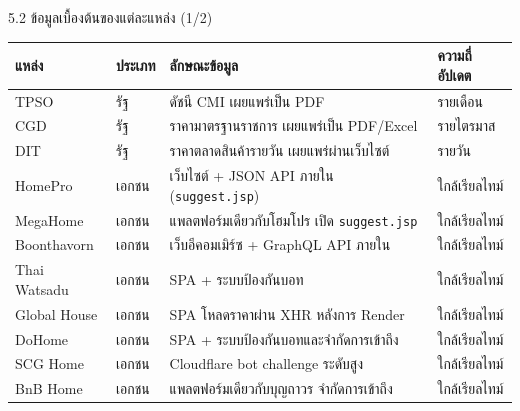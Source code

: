 \documentclass[aspectratio=169,11pt]{beamer}
\begin{document}
\begin{frame}{5.2 ข้อมูลเบื้องต้นของแต่ละแหล่ง (1/2)}
  \scriptsize
  \begin{table}
    \centering
    \begin{tabularx}{\textwidth}{l l X l}
      \toprule
      \textbf{แหล่ง} & \textbf{ประเภท} & \textbf{ลักษณะข้อมูล} & \textbf{ความถี่อัปเดต} \\
      \midrule
      TPSO         & รัฐ          & ดัชนี CMI เผยแพร่เป็น PDF                          & รายเดือน \\
      CGD          & รัฐ          & ราคามาตรฐานราชการ เผยแพร่เป็น PDF/Excel              & รายไตรมาส \\
      DIT          & รัฐ          & ราคาตลาดสินค้ารายวัน เผยแพร่ผ่านเว็บไซต์             & รายวัน \\
      HomePro      & เอกชน        & เว็บไซต์ + JSON API ภายใน (\texttt{suggest.jsp})     & ใกล้เรียลไทม์ \\
      MegaHome     & เอกชน        & แพลตฟอร์มเดียวกับโฮมโปร เปิด \texttt{suggest.jsp}    & ใกล้เรียลไทม์ \\
      Boonthavorn  & เอกชน        & เว็บอีคอมเมิร์ซ + GraphQL API ภายใน                 & ใกล้เรียลไทม์ \\
      Thai Watsadu & เอกชน        & SPA + ระบบป้องกันบอท                              & ใกล้เรียลไทม์ \\
      Global House & เอกชน        & SPA โหลดราคาผ่าน XHR หลังการ Render                 & ใกล้เรียลไทม์ \\
      DoHome       & เอกชน        & SPA + ระบบป้องกันบอทและจำกัดการเข้าถึง              & ใกล้เรียลไทม์ \\
      SCG Home     & เอกชน        & Cloudflare bot challenge ระดับสูง                  & ใกล้เรียลไทม์ \\
      BnB Home     & เอกชน        & แพลตฟอร์มเดียวกับบุญถาวร จำกัดการเข้าถึง            & ใกล้เรียลไทม์ \\
      \bottomrule
    \end{tabularx}
  \end{table}
\end{frame}
\end{document}
